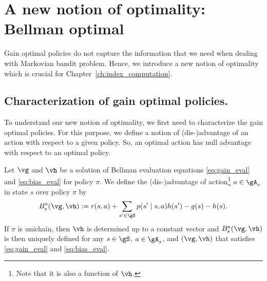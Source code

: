 \section{A new notion of optimality: Bellman optimal}
\label{ch:mdp:sec:bell}

Gain optimal policies do not capture the information that we need when dealing with Markovian bandit problem.
Hence, we introduce a new notion of optimality which is crucial for Chapter~\ref{ch:index_computation}.

\subsection{Characterization of gain optimal policies.}

To understand our new notion of optimality, we first need to characterize the gain optimal policies.
For this purpose, we define a notion of (dis-)advantage of an action with respect to a given policy.
So, an optimal action has null advantage with respect to an optimal policy.

Let $\vg$ and $\vh$ be a solution of Bellman evaluation equations \eqref{eq:gain_eval} and \eqref{eq:bias_eval} for policy $\pi$.
We define the (dis-)advantage of action\footnote{Note that it is also a function of $\vh$.} $a\in\gA_s$ in state $s$ over policy $\pi$ by
\begin{equation}
    \label{eq:advan}
    B^a_s(\vg,\vh) := r(s,a) +\sum_{s'\in\gS}p(s'\mid s,a)h(s') -g(s) -h(s).
\end{equation}
If $\pi$ is unichain, then $\vh$ is determined up to a constant vector and $B^a_s(\vg,\vh)$ is then uniquely defined for any $s\in\gS$, $a\in\gA_s$, and $(\vg,\vh)$ that satisfies \eqref{eq:gain_eval} and \eqref{eq:bias_eval}.

